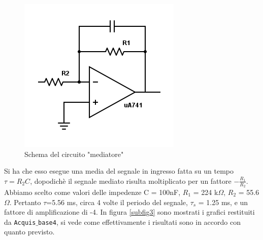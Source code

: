 \documentclass[a4paper]{article}
\begin{document}
\begin{figure}[!h]
\centering
\includegraphics[scale=.6]{es25}
\caption{Schema del circuito "mediatore"}
\label{es26}
\end{figure}

Si ha che esso esegue una media del segnale in ingresso fatta su un tempo $\tau  = R_2C$, dopodichè il segnale mediato risulta moltiplicato per un fattore $-\frac{R_1}{R_2}$. Abbiamo scelto come valori delle impedenze C = 100nF, $R_1$ = 224 k$\Omega$, $R_2$ = 55.6 $\Omega$. Pertanto $\tau$=5.56 ms, circa 4 volte il periodo del segnale, $\tau_s$ = 1.25 ms, e un fattore di amplificazione di -4. In figura \ref{subfig3} sono mostrati i grafici restituiti da \texttt{Acquis$\_$base4}, si vede come effettivamente i risultati sono in accordo con quanto previsto.
\end{document}
